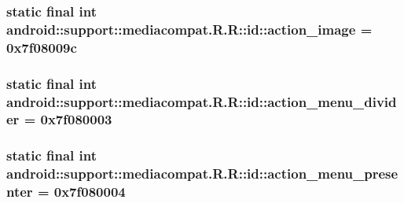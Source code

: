 \hypertarget{classandroid_1_1support_1_1mediacompat_1_1_r_1_1id_cfa2777337900cfb3f5f05d6a1845868}{
\subsubsection[{action\_\-image}]{\setlength{\rightskip}{0pt plus 5cm}static final int android::support::mediacompat.R.R::id::action\_\-image = 0x7f08009c}}
\label{classandroid_1_1support_1_1mediacompat_1_1_r_1_1id_cfa2777337900cfb3f5f05d6a1845868}


\hypertarget{classandroid_1_1support_1_1mediacompat_1_1_r_1_1id_267d38b54941902c0dfbaa9eea08f632}{
\subsubsection[{action\_\-menu\_\-divider}]{\setlength{\rightskip}{0pt plus 5cm}static final int android::support::mediacompat.R.R::id::action\_\-menu\_\-divider = 0x7f080003}}
\label{classandroid_1_1support_1_1mediacompat_1_1_r_1_1id_267d38b54941902c0dfbaa9eea08f632}


\hypertarget{classandroid_1_1support_1_1mediacompat_1_1_r_1_1id_58913fb92f31302dae751fb4f18d77d3}{
\subsubsection[{action\_\-menu\_\-presenter}]{\setlength{\rightskip}{0pt plus 5cm}static final int android::support::mediacompat.R.R::id::action\_\-menu\_\-presenter = 0x7f080004}}
\label{classandroid_1_1support_1_1mediacompat_1_1_r_1_1id_58913fb92f31302dae751fb4f18d77d3}


